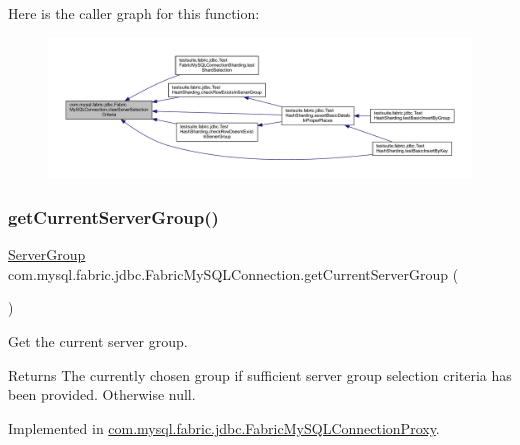 Here is the caller graph for this function\+:\nopagebreak
\begin{figure}[H]
\begin{center}
\leavevmode
\includegraphics[width=350pt]{interfacecom_1_1mysql_1_1fabric_1_1jdbc_1_1_fabric_my_s_q_l_connection_a7e0998ece683fdc723cf3c84c16e53be_icgraph}
\end{center}
\end{figure}
\mbox{\label{interfacecom_1_1mysql_1_1fabric_1_1jdbc_1_1_fabric_my_s_q_l_connection_a45d6ee9742db0ea16e51e0db018a41d2}} 
\subsubsection{\texorpdfstring{get\+Current\+Server\+Group()}{getCurrentServerGroup()}}
{\footnotesize\ttfamily \mbox{\hyperlink{classcom_1_1mysql_1_1fabric_1_1_server_group}{Server\+Group}} com.\+mysql.\+fabric.\+jdbc.\+Fabric\+My\+S\+Q\+L\+Connection.\+get\+Current\+Server\+Group (\begin{DoxyParamCaption}{ }\end{DoxyParamCaption})}

Get the current server group.

\begin{DoxyReturn}{Returns}
The currently chosen group if sufficient server group selection criteria has been provided. Otherwise null. 
\end{DoxyReturn}


Implemented in \mbox{\hyperlink{classcom_1_1mysql_1_1fabric_1_1jdbc_1_1_fabric_my_s_q_l_connection_proxy_a3daf5c72d89cbbfc7fe2d0fda11e7441}{com.\+mysql.\+fabric.\+jdbc.\+Fabric\+My\+S\+Q\+L\+Connection\+Proxy}}.

